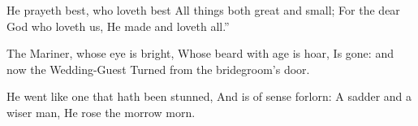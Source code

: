 \documentclass{book}
\begin{document}
  He prayeth best, who loveth best
  All things both great and small;                                   
  For the dear God who loveth us,
  He made and loveth all.''

  The Mariner, whose eye is bright,
  Whose beard with age is hoar,
  Is gone: and now the Wedding-Guest                                 
  Turned from the bridegroom's door.

  He went like one that hath been stunned,
  And is of sense forlorn:
  A sadder and a wiser man,
  He rose the morrow morn.                                           

\endVersus
\end{document}
